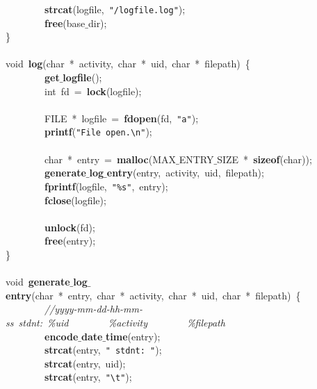 \mbox{}\ \ \ \ \ \ \ \ \textbf{strcat}(logfile,\ \texttt{"{}/logfile.log"{}}); \\
\mbox{}\ \ \ \ \ \ \ \ \textbf{free}(base$\_$dir); \\
\mbox{}\} \\
\mbox{} \\
\mbox{}void\ \textbf{log}(char\ *\ activity,\ char\ *\ uid,\ char\ *\ filepath)\ \{ \\
\mbox{}\ \ \ \ \ \ \ \ \textbf{get$\_$logfile}(); \\
\mbox{}\ \ \ \ \ \ \ \ int\ fd\ =\ \textbf{lock}(logfile); \\
\mbox{}\ \ \ \ \ \ \ \  \\
\mbox{}\ \ \ \ \ \ \ \ FILE\ *\ logfile\ =\ \textbf{fdopen}(fd,\ \texttt{"{}a"{}}); \\
\mbox{}\ \ \ \ \ \ \ \ \textbf{printf}(\texttt{"{}File\ open.}\texttt{\textbackslash{}n}\texttt{"{}}); \\
\mbox{} \\
\mbox{}\ \ \ \ \ \ \ \ char\ *\ entry\ =\ \textbf{malloc}(MAX$\_$ENTRY$\_$SIZE\ *\ \textbf{sizeof}(char)); \\
\mbox{}\ \ \ \ \ \ \ \ \textbf{generate$\_$log$\_$entry}(entry,\ activity,\ uid,\ filepath);\ \ \ \ \ \ \ \  \\
\mbox{}\ \ \ \ \ \ \ \ \textbf{fprintf}(logfile,\ \texttt{"{}\%s"{}},\ entry); \\
\mbox{}\ \ \ \ \ \ \ \ \textbf{fclose}(logfile); \\
\mbox{} \\
\mbox{}\ \ \ \ \ \ \ \ \textbf{unlock}(fd); \\
\mbox{}\ \ \ \ \ \ \ \ \textbf{free}(entry); \\
\mbox{}\} \\
\mbox{} \\
\mbox{}void\ \textbf{generate$\_$log$\_$entry}(char\ *\ entry,\ char\ *\ activity,\ char\ *\ uid,\ char\ *\ filepath)\ \{ \\
\mbox{}\ \ \ \ \ \ \ \ \textit{//yyyy-mm-dd-hh-mm-ss\ stdnt:\ \%uid\ \ \ \ \ \ \ \ \%activity\ \ \ \ \ \ \ \ \%filepath} \\
\mbox{}\ \ \ \ \ \ \ \ \textbf{encode$\_$date$\_$time}(entry); \\
\mbox{}\ \ \ \ \ \ \ \ \textbf{strcat}(entry,\ \texttt{"{}\ stdnt:\ "{}}); \\
\mbox{}\ \ \ \ \ \ \ \ \textbf{strcat}(entry,\ uid); \\
\mbox{}\ \ \ \ \ \ \ \ \textbf{strcat}(entry,\ \texttt{"{}}\texttt{\textbackslash{}t}\texttt{"{}}); \\
